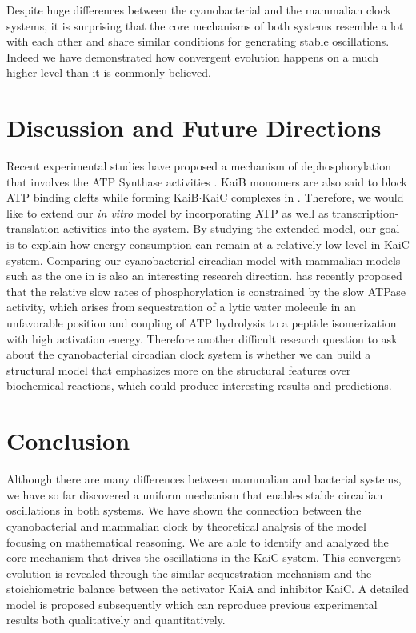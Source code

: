 \documentclass[a4paper,10pt]{article}
\numberwithin{equation}{section}
\begin{document}
Despite huge differences between the cyanobacterial and the mammalian clock systems, it is surprising that the core mechanisms of both systems resemble a lot with each other and share similar conditions for generating stable oscillations. Indeed we have demonstrated how convergent evolution happens on a much higher level than it is commonly believed.



\section{Discussion and Future Directions}

Recent experimental studies have proposed a mechanism of dephosphorylation that involves the
ATP Synthase activities \citet{johnson2012,kondo2012}. KaiB monomers are also said to block
ATP binding clefts while forming KaiB$\cdot$KaiC complexes in \citet{villarreal2013}. Therefore, we would like to extend our \textit{in vitro} model by incorporating ATP as well as transcription-translation activities into the system. By studying the extended model, our goal is to explain how energy consumption can remain at a relatively low level in KaiC system.
Comparing our cyanobacterial circadian model with mammalian models such as the one in \citet{forger2012} is also an interesting research direction. 
 \citet{Abe312} has recently proposed that the relative slow rates of phosphorylation is constrained by the slow ATPase activity, which arises from sequestration of a lytic water molecule in an unfavorable position and coupling of ATP hydrolysis to a peptide isomerization with high activation energy. Therefore another difficult research question to ask about the cyanobacterial circadian clock system is whether we can build a structural model that emphasizes more on the structural features over biochemical reactions, which could produce interesting results and predictions. 
 

 
\section{Conclusion}

 Although there are many differences between mammalian and bacterial systems, we have so far discovered a uniform mechanism that enables stable circadian oscillations in both systems. We have shown the connection between the cyanobacterial and mammalian clock by theoretical analysis of the model focusing on mathematical reasoning. We are able to identify and analyzed the core mechanism that drives the oscillations in the KaiC system. This convergent evolution is revealed through the similar sequestration mechanism and the stoichiometric balance between the activator KaiA and inhibitor KaiC. A detailed model is proposed subsequently which can reproduce previous experimental results both qualitatively and quantitatively. 
\end{document}
